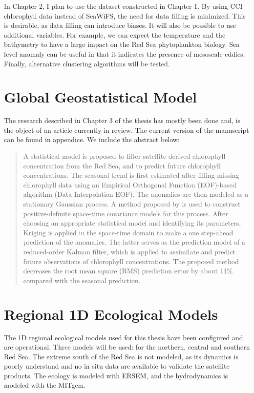 In Chapter 2, I plan to use the dataset constructed in Chapter 1.  By using CCI
chlorophyll data instead of SeaWiFS, the need for data filling is minimized.
This is desirable, as data filling can introduce biases. It will also be
possible to use additional variables. For example, we can expect the
temperature and the bathymetry to have a large impact on the Red Sea
phytoplankton biology. Sea level anomaly can be useful in that it indicates the
presence of mesoscale eddies. Finally, alternative clustering algorithms will
be tested.

\section{Global Geostatistical Model}

The research described in Chapter 3 of the thesis has mostly been
done and, is the object of an article currently in review. The current version
of the manuscript can be found in appendice. We include the abstract below:

\begin{quotation}
A statistical model is proposed to filter satellite-derived chlorophyll
concentration from the Red Sea, and to predict future chlorophyll
concentrations. The seasonal trend is first estimated after filling missing
chlorophyll data using an Empirical Orthogonal Function (EOF)-based algorithm
(Data Interpolation EOF). The anomalies are then modeled as a stationary
Gaussian process. A method proposed by \citet{Gneiting2002} is used to
construct positive-definite space-time covariance models for this process.
After choosing an appropriate statistical model and identifying its parameters,
Kriging is applied in the space-time domain to make a one step-ahead prediction
of the anomalies. The latter serves as the prediction model of a reduced-order
Kalman filter, which is applied to assimilate and predict future observations
of chlorophyll concentrations. The proposed method decreases the root mean
square (RMS) prediction error by about 11\% compared with the seasonal
prediction.
\end{quotation}

\section{Regional 1D Ecological Models}

The 1D regional ecological models used for this thesis have been configured and
are operational. Three models will be used: for the northern, central and
southern Red Sea. The extreme south of the Red Sea is not modeled, as its
dynamics is poorly understand and no in situ data are available to validate the
satellite products. The ecology is modeled with ERSEM, and the hydrodynamics
is modeled with the MITgcm.

